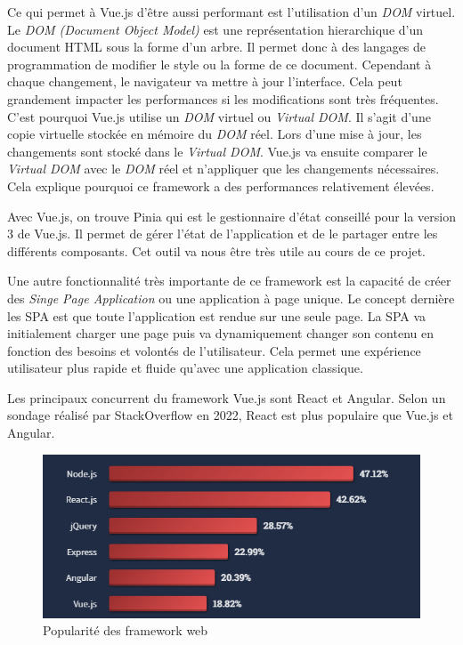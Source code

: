 Ce qui permet à Vue.js d'être aussi performant est l'utilisation d'un \emph{DOM} virtuel. Le \emph{DOM (Document Object Model)} est une représentation hierarchique d'un document HTML sous la forme d'un arbre. Il permet donc à des langages de programmation de modifier le style ou la forme de ce document. Cependant à chaque changement, le navigateur va mettre à jour l'interface. Cela peut grandement impacter les performances si les modifications sont très fréquentes. C'est pourquoi Vue.js utilise un \emph{DOM} virtuel ou \emph{Virtual DOM}. Il s'agit d'une copie virtuelle stockée en mémoire du \emph{DOM} réel. Lors d'une mise à jour, les changements sont stocké dans le \emph{Virtual DOM}. Vue.js va ensuite comparer le \emph{Virtual DOM} avec le \emph{DOM} réel et n'appliquer que les changements nécessaires. Cela explique pourquoi ce framework a des performances relativement élevées.

Avec Vue.js, on trouve Pinia qui est le gestionnaire d'état conseillé pour la version 3 de Vue.js. Il permet de gérer l'état de l'application et de le partager entre les différents composants. Cet outil va nous être très utile au cours de ce projet.

Une autre fonctionnalité très importante de ce framework est la capacité de créer des \emph{Singe Page Application} ou une application à page unique. Le concept dernière les SPA est que toute l'application est rendue sur une seule page. La SPA va initialement charger une page puis va dynamiquement changer son contenu en fonction des besoins et volontés de l'utilisateur. Cela permet une expérience utilisateur plus rapide et fluide qu'avec une application classique.

Les principaux concurrent du framework Vue.js sont React et Angular. Selon un sondage réalisé par StackOverflow \cite{StackoverflowSurvey} en 2022, React est plus populaire que Vue.js et Angular.
\begin{center}
  \begin{figure}[H]%
    \includegraphics[width=\textwidth]{./assets/figures/VueVSReactVSAngular.png}
    \caption{Popularité des framework web \label{VueVSReactVSAngular.png}}
  \end{figure}
\end{center}

